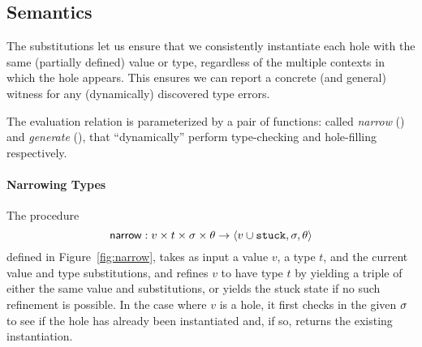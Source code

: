 \subsection{Semantics}
\label{sec:semantics}
%
%
The substitutions let us ensure that we consistently instantiate
each hole with the same (partially defined) value or type, regardless
of the multiple contexts in which the hole appears. This ensures we
can report a concrete (and general) witness for any (dynamically)
discovered type errors.

The evaluation relation is parameterized by a pair of functions:
called \emph{narrow} (\forcesym) and \emph{generate} (\gensym),
that ``dynamically'' perform type-checking and hole-filling
respectively.

\paragraph{Narrowing Types} The procedure %
$$
\mathsf{narrow} : v \times t \times \sigma \times \theta \rightarrow \langle v \cup \mathtt{stuck}, \sigma, \theta \rangle
$$
defined in Figure~\ref{fig:narrow}, takes as input a value $v$, a type
$t$, and the current value and type substitutions, and refines $v$ to
have type $t$ by yielding a triple of either the same value and
substitutions, or yields the stuck state if no such refinement is
possible. In the case where $v$ is a hole, it first checks in the given
$\sigma$ to see if the hole has already been instantiated and, if so,
returns the existing instantiation.
%
